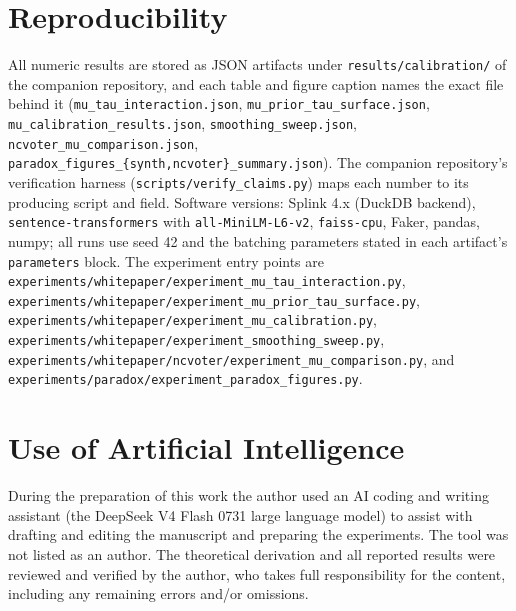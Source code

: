 \documentclass[11pt]{article}
\begin{document}
\section*{Reproducibility}
All numeric results are stored as JSON artifacts under \texttt{results/calibration/} of the
companion repository, and each table and figure caption names the exact file behind it
(\texttt{mu\_tau\_interaction.json}, \texttt{mu\_prior\_tau\_surface.json},
\texttt{mu\_calibration\_results.json}, \texttt{smoothing\_sweep.json},
\texttt{ncvoter\_mu\_comparison.json}, \texttt{paradox\_figures\_\{synth,ncvoter\}\_summary.json}).
The companion repository's verification harness
(\texttt{scripts/verify\_claims.py}) maps each number to its producing script and field.
Software versions: Splink 4.x (DuckDB backend), \texttt{sentence-transformers} with
\texttt{all-MiniLM-L6-v2}, \texttt{faiss-cpu}, Faker, pandas, numpy; all runs use seed 42 and
the batching parameters stated in each artifact's \texttt{parameters} block. The experiment
entry points are \texttt{experiments/whitepaper/experiment\_mu\_tau\_interaction.py},
\texttt{experiments/whitepaper/experiment\_mu\_prior\_tau\_surface.py},
\texttt{experiments/whitepaper/experiment\_mu\_calibration.py}, \texttt{experiments/whitepaper/experiment\_smoothing\_sweep.py},
\texttt{experiments/whitepaper/ncvoter/experiment\_mu\_comparison.py}, and
\texttt{experiments/paradox/experiment\_paradox\_figures.py}.

\section*{Use of Artificial Intelligence}
During the preparation of this work the author used an AI coding and writing assistant (the
DeepSeek V4 Flash 0731 large language model) to assist with drafting and editing the
manuscript and preparing the experiments. The tool was not listed as an author. The
theoretical derivation and all reported results were reviewed and verified by the author,
who takes full responsibility for the content, including any remaining errors and/or omissions.
\end{document}
